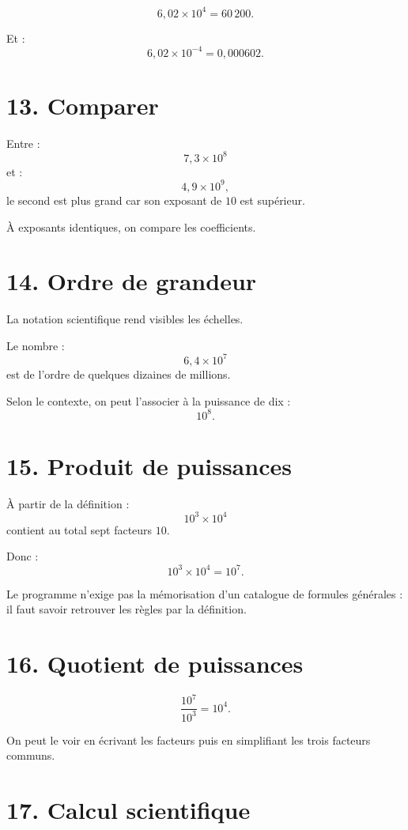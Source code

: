\[
6{,}02\times10^4=60\,200.
\]

Et :
\[
6{,}02\times10^{-4}=0{,}000602.
\]

\section{13. Comparer}

Entre :
\[
7{,}3\times10^8
\]
et :
\[
4{,}9\times10^9,
\]
le second est plus grand car son exposant de $10$ est supérieur.

À exposants identiques, on compare les coefficients.

\section{14. Ordre de grandeur}

La notation scientifique rend visibles les échelles.

Le nombre :
\[
6{,}4\times10^7
\]
est de l'ordre de quelques dizaines de millions.

Selon le contexte, on peut l'associer à la puissance de dix :
\[
10^8.
\]

\section{15. Produit de puissances}

À partir de la définition :
\[
10^3\times10^4
\]
contient au total sept facteurs $10$.

Donc :
\[
10^3\times10^4=10^7.
\]

\begin{remarque}
Le programme n'exige pas la mémorisation d'un catalogue de formules générales : il faut savoir retrouver les règles par la définition.
\end{remarque}

\section{16. Quotient de puissances}

\[
\dfrac{10^7}{10^3}
=
10^4.
\]

On peut le voir en écrivant les facteurs puis en simplifiant les trois facteurs communs.

\section{17. Calcul scientifique}

